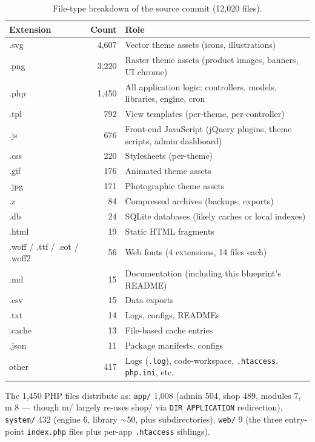 \documentclass[11pt,a4paper]{article}
\begin{document}
\begin{table}[htbp]
\centering
\caption{File-type breakdown of the source commit (12,020 files).}\label{tab:filetypes}
\small
\begin{tabularx}{\columnwidth}{lrX}
\toprule
\textbf{Extension} & \textbf{Count} & \textbf{Role} \\
\midrule
.svg   & 4,607 & Vector theme assets (icons, illustrations) \\
.png   & 3,220 & Raster theme assets (product images, banners, UI chrome) \\
.php   & 1,450 & All application logic: controllers, models, libraries, engine, cron \\
.tpl   & 792   & View templates (per-theme, per-controller) \\
.js    & 676   & Front-end JavaScript (jQuery plugins, theme scripts, admin dashboard) \\
.css   & 220   & Stylesheets (per-theme) \\
.gif   & 176   & Animated theme assets \\
.jpg   & 171   & Photographic theme assets \\
.z     & 84    & Compressed archives (backups, exports) \\
.db    & 24    & SQLite databases (likely caches or local indexes) \\
.html  & 19    & Static HTML fragments \\
.woff / .ttf / .eot / .woff2 & 56 & Web fonts (4 extensions, 14 files each) \\
.md    & 15    & Documentation (including this blueprint's README) \\
.csv   & 15    & Data exports \\
.txt   & 14    & Logs, configs, READMEs \\
.cache & 13    & File-based cache entries \\
.json  & 11    & Package manifests, configs \\
other  & 417   & Logs (\texttt{.log}), code-workspace, \texttt{.htaccess}, \texttt{php.ini}, etc. \\
\bottomrule
\end{tabularx}
\end{table}

The 1,450 PHP files distribute as: \texttt{app/} 1,008 (admin 504,
shop 489, modules 7, m 8 --- though m/ largely re-uses shop/ via
\texttt{DIR\_APPLICATION} redirection), \texttt{system/} 432
(engine 6, library $\sim$50, plus subdirectories), \texttt{web/} 9
(the three entry-point \texttt{index.php} files plus per-app
\texttt{.htaccess} siblings).
\end{document}
